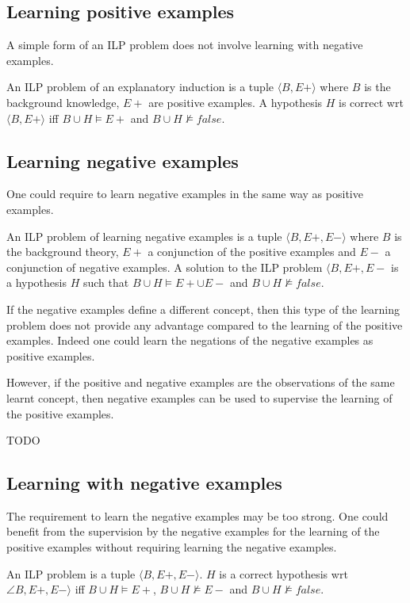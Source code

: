 \subsection{Learning positive examples}
A simple form of an ILP problem does not involve learning with negative examples.
\begin{defn}
An ILP problem of an explanatory induction\cite{yamamoto2012inverse} is a tuple $\langle B, E+ \rangle$ where $B$ is the background knowledge, $E+$ are positive examples. A hypothesis $H$ is correct wrt $\langle B, E+\rangle$ iff
$B \cup H \models E+$ and $B \cup H \not\models false$.
\end{defn}
\subsection{Learning negative examples}
One could require to learn negative examples in the same way as positive examples.
\begin{defn}
An ILP problem of learning negative examples is a tuple $\langle B, E+, E- \rangle$ where $B$ is the background theory, $E+$ a conjunction of the positive examples and $E-$ a conjunction of negative examples. A solution to the ILP problem $\langle B, E+, E-$ is a hypothesis $H$ such that
$B \cup H \models E+ \cup E-$ and $B \cup H \not\models false$.
\end{defn}
If the negative examples define a different concept, then this type of the learning problem does not provide any advantage compared to the learning of the positive examples. Indeed one could learn the negations of the negative examples as positive examples.

However, if the positive and negative examples are the observations of the same learnt concept, then negative examples can be used to supervise the learning of the positive examples.

\begin{exmp}
TODO
\end{exmp}

\subsection{Learning with negative examples}
The requirement to learn the negative examples may be too strong. One could benefit from the supervision by the negative examples for the learning of the positive examples without requiring learning the negative examples.

\begin{defn}
An ILP problem is a tuple $\langle B, E+, E- \rangle$. $H$ is a correct hypothesis wrt $\angle B, E+, E- \rangle$ iff
$B \cup H \models E+$, $B \cup H \not\models E-$ and $B \cup H \not\models false$.
\end{defn}

